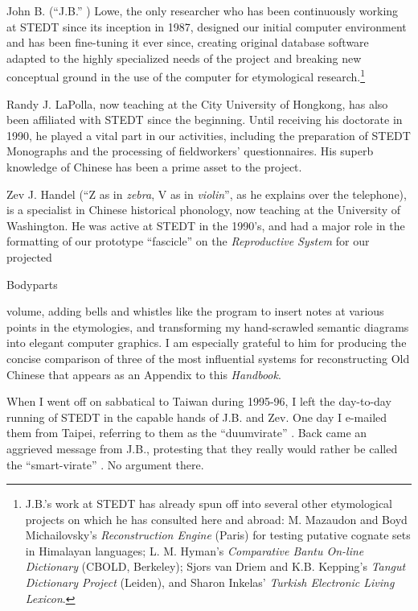 \documentclass[12pt]{article}
\begin{document}
\begin{itemize}
\item John B. (``J.B.'' ) Lowe, the only researcher who has been continuously working at STEDT since its inception in 1987, designed our initial computer environment and has been fine-tuning it ever since, creating original database software adapted to the highly specialized needs of the project and breaking new conceptual ground in the use of the computer for etymological research.\footnote{J.B.'s work at STEDT has already spun off into several other etymological projects on which he has consulted here and abroad: M. Mazaudon and Boyd Michailovsky's {\it Reconstruction Engine} (Paris) for testing putative cognate sets in Himalayan languages; L. M. Hyman's {\it Comparative Bantu On-line Dictionary} (CBOLD, Berkeley); Sjors van Driem and K.B. Kepping's {\it Tangut Dictionary Project} (Leiden), and Sharon Inkelas'  {\it Turkish Electronic Living Lexicon}.}
\item Randy J. LaPolla, now teaching at the City University of Hongkong, has also been affiliated with STEDT since the beginning. Until receiving his doctorate in 1990, he played a vital part in our activities, including the preparation of STEDT Monographs and the processing of fieldworkers' questionnaires. His superb knowledge of Chinese has been a prime asset to the project.
\item Zev J. Handel (``Z as in {\it zebra}, V as in {\it violin}'', as he explains over the telephone), is a specialist in Chinese historical phonology, now teaching at the University of Washington. He was active at STEDT in the 1990's, and had a major role in the formatting of our prototype ``fascicle''  on the {\it Reproductive System} for our projected {\item Bodyparts} volume, adding bells and whistles like the program to insert notes at various points in the etymologies, and transforming my hand-scrawled semantic diagrams into elegant computer graphics. I am especially grateful to him for producing the concise comparison of three of the most influential systems for reconstructing Old Chinese that appears as an Appendix to this {\it Handbook}.
\end{itemize}

When I went off on sabbatical to Taiwan during 1995-96, I left the day-to-day running of STEDT in the capable hands of J.B. and Zev. One day I e-mailed them from Taipei, referring to them as the ``duumvirate'' . Back came an aggrieved message from J.B., protesting that they really would rather be called the ``smart-virate'' . No argument there.
\end{document}
